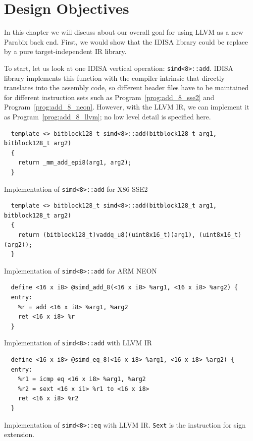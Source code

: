 \chapter{Design Objectives}
\label{three}

In this chapter we will discuss about our overall goal for using LLVM as a new Parabix back end. First, we would show that the IDISA library could be replace by a pure target-independent IR library.

To start, let us look at one IDISA vertical operation: {\tt simd<8>::add}. IDISA library implements this function with the compiler intrinsic that directly translates into the assembly code, so different header files have to be maintained for different instruction sets such as Program~\ref{prog:add_8_sse2} and Program~\ref{prog:add_8_neon}. However, with the LLVM IR, we can implement it as Program~\ref{prog:add_8_llvm}; no low level detail is specified here.

\begin{program}
\begin{verbatim}
  template <> bitblock128_t simd<8>::add(bitblock128_t arg1, bitblock128_t arg2)
  {
    return _mm_add_epi8(arg1, arg2);
  }
\end{verbatim}
\caption{Implementation of {\tt simd<8>::add} for X86 SSE2}
\label{prog:add_8_sse2}
\end{program}

\begin{program}
\begin{verbatim}
  template <> bitblock128_t simd<8>::add(bitblock128_t arg1, bitblock128_t arg2)
  {
    return (bitblock128_t)vaddq_u8((uint8x16_t)(arg1), (uint8x16_t)(arg2));
  }
\end{verbatim}
\caption{Implementation of {\tt simd<8>::add} for ARM NEON}
\label{prog:add_8_neon}
\end{program}

\begin{program}
\begin{verbatim}
  define <16 x i8> @simd_add_8(<16 x i8> %arg1, <16 x i8> %arg2) {
  entry:
    %r = add <16 x i8> %arg1, %arg2
    ret <16 x i8> %r
  }
\end{verbatim}
\caption{Implementation of {\tt simd<8>::add} with LLVM IR}
\label{prog:add_8_llvm}
\end{program}

\begin{program}
\begin{verbatim}
  define <16 x i8> @simd_eq_8(<16 x i8> %arg1, <16 x i8> %arg2) {
  entry:
    %r1 = icmp eq <16 x i8> %arg1, %arg2
    %r2 = sext <16 x i1> %r1 to <16 x i8>
    ret <16 x i8> %r2
  }
\end{verbatim}
\caption[Implementation of {\tt simd<8>::eq} with LLVM IR]{Implementation of {\tt simd<8>::eq} with LLVM IR. {\tt Sext} is the instruction for sign extension.}
\label{prog:icmp}
\end{program}

